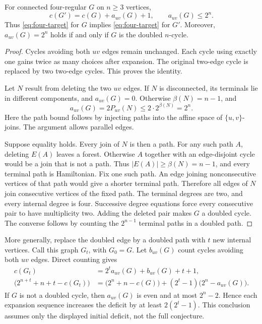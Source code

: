 \begin{proposition}\label{prop:double-expansion}
For connected four-regular $G$ on $n\ge3$ vertices,
\[
 c(G')=c(G)+a_{uv}(G)+1,
 \qquad a_{uv}(G)\le2^n.
\]
Thus \eqref{eq:four-target} for $G$ implies \eqref{eq:four-target} for $G'$.
Moreover, $a_{uv}(G)=2^n$ holds if and only if $G$ is the doubled $n$-cycle.
\end{proposition}

\begin{proof}
Cycles avoiding both $uv$ edges remain unchanged.
Each cycle using exactly one gains twice as many choices after expansion.
The original two-edge cycle is replaced by two two-edge cycles.
This proves the identity.

Let $N$ result from deleting the two $uv$ edges.
If $N$ is disconnected, its terminals lie in different components, and $a_{uv}(G)=0$.
Otherwise $\beta(N)=n-1$, and
\[
 a_{uv}(G)=2P_{uv}(N)\le2\cdot2^{\beta(N)}=2^n.
\]
Here the path bound follows by injecting paths into the affine space of $\{u,v\}$-joins.
The argument allows parallel edges.

Suppose equality holds.
Every join of $N$ is then a path.
For any such path $A$, deleting $E(A)$ leaves a forest.
Otherwise $A$ together with an edge-disjoint cycle would be a join that is not a path.
Thus $|E(A)|\ge\beta(N)=n-1$, and every terminal path is Hamiltonian.
Fix one such path.
An edge joining nonconsecutive vertices of that path would give a shorter terminal path.
Therefore all edges of $N$ join consecutive vertices of the fixed path.
The terminal degrees are two, and every internal degree is four.
Successive degree equations force every consecutive pair to have multiplicity two.
Adding the deleted pair makes $G$ a doubled cycle.
The converse follows by counting the $2^{n-1}$ terminal paths in a doubled path.
\end{proof}

More generally, replace the doubled edge by a doubled path with $t$ new internal vertices.
Call this graph $G_t$, with $G_0=G$.
Let $b_{uv}(G)$ count cycles avoiding both $uv$ edges.
Direct counting gives
\begin{align}
 c(G_t)&=2^t a_{uv}(G)+b_{uv}(G)+t+1,\\
 \bigl(2^{n+t}+n+t-c(G_t)\bigr)
 &=\bigl(2^n+n-c(G)\bigr)+(2^t-1)\bigl(2^n-a_{uv}(G)\bigr).
 \label{eq:double-chain-deficit}
\end{align}
If $G$ is not a doubled cycle, then $a_{uv}(G)$ is even and at most $2^n-2$.
Hence each expansion sequence increases the deficit by at least $2(2^t-1)$.
This conclusion assumes only the displayed initial deficit, not the full conjecture.

